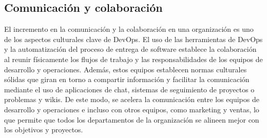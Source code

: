 \subsection{Comunicación y colaboración}

El incremento en la comunicación y la colaboración en una organización
es uno de los aspectos culturales clave de DevOps. El uso de las
herramientas de DevOps y la automatización del proceso de entrega de
software establece la colaboración al reunir físicamente los flujos de
trabajo y las responsabilidades de los equipos de desarrollo y
operaciones. Además, estos equipos establecen normas culturales
sólidas que giran en torno a compartir información y facilitar la
comunicación mediante el uso de aplicaciones de chat, sistemas de
seguimiento de proyectos o problemas y wikis. De este modo, se acelera
la comunicación entre los equipos de desarrollo y operaciones e
incluso con otros equipos, como marketing y ventas, lo que permite que
todos los departamentos de la organización se alineen mejor con los
objetivos y proyectos.
